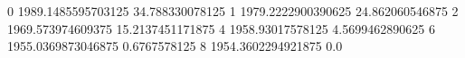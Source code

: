 0 1989.1485595703125 34.788330078125
1 1979.2222900390625 24.862060546875
2 1969.573974609375 15.2137451171875
4 1958.93017578125 4.5699462890625
6 1955.0369873046875 0.6767578125
8 1954.3602294921875 0.0
